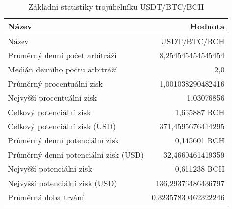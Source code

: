 \begin{table}\centering
\caption{Základní statistiky trojúhelníku USDT/BTC/BCH}
\label{USDTBTCBCH_stats}
\begin{tabular}{|| l | r ||}
\hline Název & Hodnota \\ 
\hline\hline Název & USDT/BTC/BCH \\ 
\hline Průměrný denní počet arbitráží & 8,254545454545454 \\ 
\hline Medián denního počtu arbitráží & 2,0 \\ 
\hline Průměrný procentuální zisk & 1,001038290482416 \\ 
\hline Nejvyšší procentuální zisk & 1,03076856 \\ 
\hline Celkový potenciální zisk & 1,665887 BCH \\ 
\hline Celkový potenciální zisk (USD) & 371,4595676414295 \\ 
\hline Průměrný denní potenciální zisk & 0,145601 BCH \\ 
\hline Průměrný denní potenciální zisk (USD) & 32,4660461419359 \\ 
\hline Nejvyšší potenciální zisk & 0,611238 BCH \\ 
\hline Nejvyšší potenciální zisk (USD) & 136,29376486436797 \\ 
\hline Průměrná doba trvání & 0,32357830462322246 \\ 
\hline
\end{tabular}
\end{table}